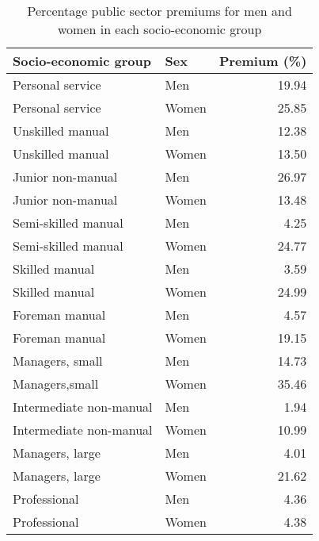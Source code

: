 \documentclass[a4paper,11pt,titlepage]{article}
\begin{document}
\begin{table}[ht]
\caption{Percentage public sector premiums for men and women in each socio-economic group \label{tab:baseprem}}
\begin{center}
\begin{tabular}{llr}
  \toprule
  Socio-economic group & Sex & Premium (\%) \\
  \midrule
   Personal service & Men & 19.94 \\
   Personal service & Women & 25.85 \\
   Unskilled manual & Men & 12.38 \\
   Unskilled manual & Women & 13.50 \\
   Junior non-manual & Men & 26.97 \\
   Junior non-manual & Women & 13.48 \\
   Semi-skilled manual & Men & 4.25 \\
   Semi-skilled manual & Women & 24.77 \\
   Skilled manual & Men & 3.59 \\
   Skilled manual & Women & 24.99 \\
   Foreman manual & Men & 4.57 \\
   Foreman manual & Women & 19.15 \\
   Managers, small & Men & 14.73 \\
   Managers,small & Women & 35.46 \\
   Intermediate non-manual& Men & 1.94 \\
   Intermediate non-manual & Women & 10.99 \\
   Managers, large & Men & 4.01 \\
   Managers, large & Women & 21.62 \\
   Professional & Men & 4.36 \\
   Professional & Women & 4.38 \\
\bottomrule
\end{tabular}
\end{center}
\end{table}
\end{document}

